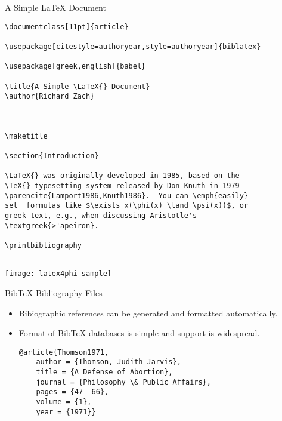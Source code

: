 \begin{frame}{A Simple \LaTeX{} Document}

\begin{verbatim}
\documentclass[11pt]{article}

\usepackage[citestyle=authoryear,style=authoryear]{biblatex}

\usepackage[greek,english]{babel}

\title{A Simple \LaTeX{} Document}
\author{Richard Zach}



\maketitle

\section{Introduction}

\LaTeX{} was originally developed in 1985, based on the 
\TeX{} typesetting system released by Don Knuth in 1979
\parencite{Lamport1986,Knuth1986}.  You can \emph{easily} 
set  formulas like $\exists x(\phi(x) \land \psi(x))$, or 
greek text, e.g., when discussing Aristotle's 
\textgreek{>'apeiron}.

\printbibliography


\end{verbatim}
\end{frame}

\begin{frame}

\texttt{[image: latex4phi-sample]}
\end{frame}

\begin{frame}[fragile]{Bib\TeX{} Bibliography Files}

\begin{itemize}
\item Bibiographic references can be generated and formatted automatically.
\item Format of Bib\TeX{} databases is simple and support is widespread.
\begin{verbatim}
@article{Thomson1971,
    author = {Thomson, Judith Jarvis},
    title = {A Defense of Abortion},
    journal = {Philosophy \& Public Affairs},
    pages = {47--66},
    volume = {1},
    year = {1971}}
\end{verbatim}
\end{itemize}
\end{frame}

